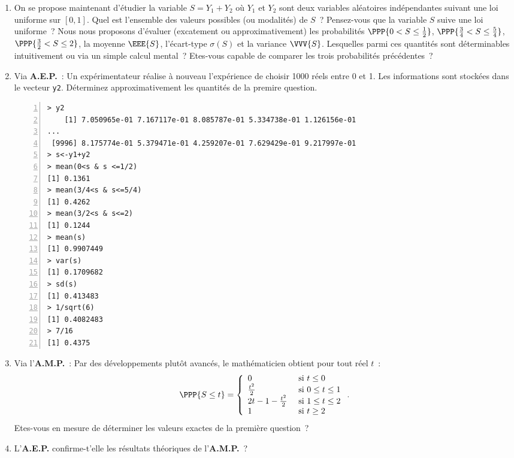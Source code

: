 \documentclass[10pt]{report}
\begin{document}
\begin{exercice}\label{ex:sommeUnifs}
\begin{enumerate}
\item On se propose maintenant d'étudier la variable $S=Y_1+Y_2$ où $Y_1$ et $Y_2$ sont deux variables aléatoires indépendantes suivant une loi uniforme sur $[0,1]$. Quel est l'ensemble des valeurs possibles (ou modalités) de $S$~? Pensez-vous que la variable $S$ suive une loi uniforme~?
Nous nous proposons d'évaluer (excatement ou approximativement) les probabilités $\PPP{0< S \leq \frac12}$, $\PPP{\frac34< S \leq \frac54}$, $\PPP{\frac32< S \leq 2}$, la moyenne $\EEE{S}$, l'écart-type $\sigma(S)$ et la variance $\VVV{S}$.  Lesquelles parmi ces quantités sont déterminables intuitivement ou via un simple calcul mental~? Etes-vous capable de comparer les trois probabilités précédentes~?


\item Via \textbf{A.E.P.}~: Un expérimentateur réalise à nouveau l'expérience de choisir 1000 réels entre 0 et 1. Les informations sont stockées dans le vecteur \texttt{y2}. Déterminez approximativement les quantités de la premire question.

\begin{Verbatim}[frame=leftline,fontfamily=tt,fontshape=n,numbers=left]
> y2
    [1] 7.050965e-01 7.167117e-01 8.085787e-01 5.334738e-01 1.126156e-01
...
 [9996] 8.175774e-01 5.379471e-01 4.259207e-01 7.629429e-01 9.217997e-01
> s<-y1+y2
> mean(0<s & s <=1/2)
[1] 0.1361
> mean(3/4<s & s<=5/4)
[1] 0.4262
> mean(3/2<s & s<=2)
[1] 0.1244
> mean(s)
[1] 0.9907449
> var(s)
[1] 0.1709682
> sd(s)
[1] 0.413483
> 1/sqrt(6)
[1] 0.4082483
> 7/16
[1] 0.4375
\end{Verbatim}


\item Via l'\textbf{A.M.P.}~: Par des développements plutôt avancés, le mathématicien obtient pour tout réel $t$~: 
$$
\PPP{S\leq t}= \left\{ \begin{array}{ll}
0 & \mbox{ si } t\leq 0 \\
\frac{t^2}2 & \mbox{ si } 0\leq t\leq 1 \\
2t-1-\frac{t^2}2& \mbox{ si } 1\leq t \leq 2 \\
1 & \mbox{ si } t\geq 2 
\end{array} \right..
$$ Etes-vous en mesure de déterminer les valeurs exactes de la première question~?

\item L'\textbf{A.E.P.} confirme-t'elle les résultats théoriques de l'\textbf{A.M.P.}~? 

\end{enumerate}
\end{exercice}
\end{document}

